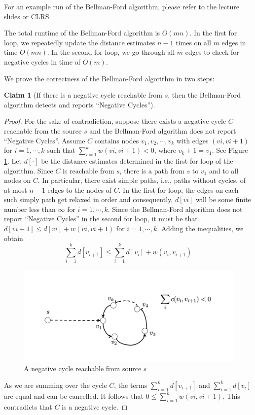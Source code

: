 \documentclass [12pt]{article}
\theoremstyle{definition}
\newtheorem{claim}{Claim}
\begin{document}
For an example run of the Bellman-Ford algorithm, please refer to the lecture slides or CLRS.

The total runtime of the Bellman-Ford algorithm is $O(mn)$. In the first for loop, we repeatedly update the distance estimates $n - 1$ times on all $m$ edges in time $O(mn)$. In the second for loop, we go through all $m$ edges to check for negative cycles in time of $O(m)$. 

We prove the correctness of the Bellman-Ford algorithm in two steps:

\begin{claim}[If there is a negative cycle reachable from $s$, then the Bellman-Ford algorithm detects and reports ``Negative Cycles'']
\begin{proof}

For the sake of contradiction, suppose there exists a negative cycle $C$ reachable from the source $s$ and the Bellman-Ford algorithm does not report ``Negative Cycles''. Assume $C$ contains nodes $v_1, v_2, \cdots , v_k$ with edges $(vi , vi+1)$ for $i = 1, \cdots , k$ such that $\sum^{k}_{i=1} w(vi , vi+1) < 0$, where $v_k+1 = v_1$. See Figure \ref{fig:cycle}. Let $d[\cdot]$ be the distance estimates determined in the first for loop of the algorithm. Since $C$ is reachable from $s$, there is a path from $s$ to $v_1$ and to all nodes on $C$. In particular, there exist simple paths, i.e., paths without cycles, of at most $n - 1$ edges to the nodes of $C$. In the first for loop, the edges on each such simply path get relaxed in order and consequently, $d[vi ]$ will be some finite number less than $\infty$ for $i = 1, \cdots , k$. Since the Bellman-Ford algorithm does not report ``Negative Cycles'' in the second for loop, it must be that $d[vi+1] \leq d[vi ] + w(vi , vi+1)$ for $i = 1, \cdots , k$. Adding the inequalities, we obtain
$$
\sum_{i=1}^k d[v_{i+1}] \leq \sum_{i=1}^k d[v_i] + w(v_i, v_{i+1})
$$


\begin{figure}
\includegraphics[scale=0.5]{Cycle.png}
\caption{A negative cycle reachable from source $s$}
\label{fig:cycle}
\end{figure}
 
As we are summing over the cycle $C$, the terms $\sum_{i=1}^k d[v_{i+1}]$ and $\sum_{i=1}^k d[v_i ]$ are equal and can be cancelled. It follows that $0 \leq \sum_{i=1}^k w(vi , vi+1)$. This contradicts that $C$ is a negative cycle.

\end{proof}
\end{claim}
\end{document}
